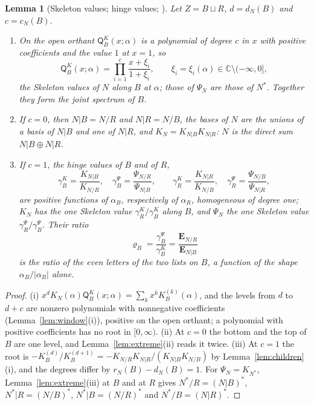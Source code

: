 \documentclass[11pt]{article}
\theoremstyle{plain}
\newtheorem{lemma}[prop]{Lemma}
\theoremstyle{definition}
\theoremstyle{remark}
\newcommand{\sQ}{\mathsf Q}
\begin{document}
\begin{lemma}[Skeleton values; hinge values; {\cite[Def.~12.9, p.~71; Def.~12.13, p.~73; Def.~18.4, p.~115; Cor.~18.7, p.~117]{F}}]\label{lem:skeleton}
Let $Z=B\sqcup R$, $d=d_N(B)$ and $c=c_N(B)$.
\begin{enumerate}[label=(\roman*)]
\item On the open orthant $\sQ^K_B(x;\alpha)$ is a polynomial of degree $c$ in $x$ with positive coefficients and the value $1$ at $x=1$, so
\[
\sQ^K_B(x;\alpha)=\prod_{i=1}^c\frac{x+\xi_i}{1+\xi_i},\qquad \xi_i=\xi_i(\alpha)\in\mathbb C\setminus(-\infty,0],
\]
the \emph{Skeleton values} of $N$ along $B$ at $\alpha$; those of $\Psi_N$ are those of $N^\ast$. Together they form the \emph{joint spectrum} of $B$.
\item If $c=0$, then $N|B=N/R$ and $N|R=N/B$, the bases of $N$ are the unions of a basis of $N|B$ and one of $N|R$, and $K_N=K_{N|B}K_{N|R}$: $N$ is the \emph{direct sum} $N|B\oplus N|R$.
\item If $c=1$, the \emph{hinge values} of $B$ and of $R$,
\[
\gamma^K_B=\frac{K_{N|B}}{K_{N/R}},\quad \gamma^\Psi_B=\frac{\Psi_{N/R}}{\Psi_{N|B}},\qquad \gamma^K_R=\frac{K_{N|R}}{K_{N/B}},\quad \gamma^\Psi_R=\frac{\Psi_{N/B}}{\Psi_{N|R}},
\]
are positive functions of $\alpha_B$, respectively of $\alpha_R$, homogeneous of degree one; $K_N$ has the one Skeleton value $\gamma^K_R/\gamma^K_B$ along $B$, and $\Psi_N$ the one Skeleton value $\gamma^\Psi_R/\gamma^\Psi_B$. Their \emph{ratio}
\[
\varrho_B=\frac{\gamma^\Psi_B}{\gamma^K_B}=\frac{\mathbf E_{N/R}}{\mathbf E_{N|B}}
\]
is the ratio of the even letters of the two lists on $B$, a function of the shape $\alpha_B/|\alpha_B|$ alone.
\end{enumerate}
\end{lemma}

\begin{proof}
(i) $x^{d}K_N(\alpha)\sQ^K_B(x;\alpha)=\sum_kx^kK^{(k)}_B(\alpha)$, and the levels from $d$ to $d+c$ are nonzero polynomials with nonnegative coefficients (Lemma~\ref{lem:window}(i)), positive on the open orthant; a polynomial with positive coefficients has no root in $[0,\infty)$. (ii) At $c=0$ the bottom and the top of $B$ are one level, and Lemma~\ref{lem:extreme}(ii) reads it twice. (iii) At $c=1$ the root is $-K^{(d)}_B/K^{(d+1)}_B=-K_{N/R}K_{N|R}/(K_{N|B}K_{N/B})$ by Lemma~\ref{lem:children}(i), and the degrees differ by $r_N(B)-d_N(B)=1$. For $\Psi_N=K_{N^\ast}$, Lemma~\ref{lem:extreme}(iii) at $B$ and at $R$ gives $N^\ast/R=(N|B)^\ast$, $N^\ast|R=(N/B)^\ast$, $N^\ast|B=(N/R)^\ast$ and $N^\ast/B=(N|R)^\ast$.
\end{proof}
\end{document}
